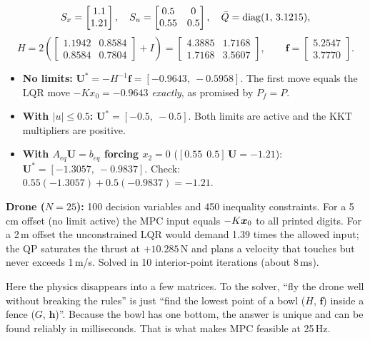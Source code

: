 \begin{toybox}
\[
S_x=\begin{bmatrix}1.1\\1.21\end{bmatrix},\quad S_u=\begin{bmatrix}0.5&0\\0.55&0.5\end{bmatrix},\quad
\bar Q=\operatorname{diag}(1,\,3.1215),
\]
\[
H=2\left(\begin{bmatrix}1.1942&0.8584\\0.8584&0.7804\end{bmatrix}+I\right)=\begin{bmatrix}4.3885&1.7168\\1.7168&3.5607\end{bmatrix},\qquad
\bm f=\begin{bmatrix}5.2547\\3.7770\end{bmatrix}.
\]
\begin{itemize}
\item \textbf{No limits:} $\mathbf U^*=-H^{-1}\bm f=[-0.9643,\ -0.5958]$. The first move equals the LQR move
      $-Kx_0=-0.9643$ \emph{exactly}, as promised by $P_f=P$.
\item \textbf{With $|u|\le0.5$:} $\mathbf U^*=[-0.5,\ -0.5]$. Both limits are active and the KKT multipliers are positive.
\item \textbf{With $A_{eq}\mathbf U=b_{eq}$ forcing $x_2=0$} ($[0.55\ \ 0.5]\,\mathbf U=-1.21$): $\mathbf U^*=[-1.3057,\ -0.9837]$.
      Check: $0.55(-1.3057)+0.5(-0.9837)=-1.21$.
\end{itemize}
\textbf{Drone ($N=25$):} 100 decision variables and 450 inequality constraints. For a 5\,cm offset (no limit active) the
MPC input equals $-K\bm{x}_0$ to all printed digits. For a 2\,m offset the unconstrained LQR would demand 1.39 times the
allowed input; the QP saturates the thrust at $+10.285$\,N and plans a velocity that touches but never exceeds
1\,m/s. Solved in 10 interior-point iterations (about 8\,ms).
\end{toybox}

\begin{projbox}
Here the physics disappears into a few matrices. To the solver, ``fly the drone well without breaking the
rules'' is just ``find the lowest point of a bowl ($H$, $\bm f$) inside a fence ($G$, $\bm h$)''. Because the bowl has
one bottom, the answer is unique and can be found reliably in milliseconds. That is what makes MPC feasible at 25\,Hz.
\end{projbox}

